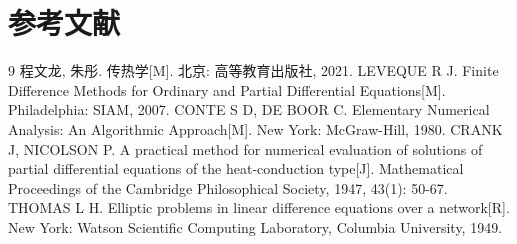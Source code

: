 \section*{参考文献}

\begin{thebibliography}{9}
   程文龙, 朱彤. 传热学[M]. 北京: 高等教育出版社, 2021.
   LEVEQUE R J. Finite Difference Methods for Ordinary and Partial Differential Equations[M]. Philadelphia: SIAM, 2007.
   CONTE S D, DE BOOR C. Elementary Numerical Analysis: An Algorithmic Approach[M]. New York: McGraw-Hill, 1980.
   CRANK J, NICOLSON P. A practical method for numerical evaluation of solutions of partial differential equations of the heat-conduction type[J]. Mathematical Proceedings of the Cambridge Philosophical Society, 1947, 43(1): 50-67.
   THOMAS L H. Elliptic problems in linear difference equations over a network[R]. New York: Watson Scientific Computing Laboratory, Columbia University, 1949.
\end{thebibliography}
